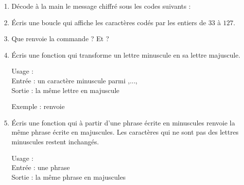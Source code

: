 \documentclass[11pt,class=report,crop=false]{standalone}
\begin{document}

\begin{activite}



\begin{enumerate}
  \item Décode à la main le message chiffré sous les codes suivants : 
   
    
  \item  Écris une boucle qui affiche les caractères codés par les entiers de $33$ à $127$.
  
  \item Que renvoie la commande  ? Et  ?
  
  \item Écris une fonction  qui transforme un lettre minuscule en sa lettre majuscule.
  
  \begin{fonction}
  
   Usage : \\
   Entrée : un caractère minuscule parmi ,...,\\
   Sortie : la même lettre en majuscule
  
  \medskip
     
   Exemple :  renvoie 
  \end{fonction} 
  
    \item Écris une fonction  qui à partir d'une phrase écrite en minuscules renvoie la même phrase écrite en majuscules. Les caractères qui ne sont pas des lettres minuscules restent inchangés.
  
  \begin{fonction}[\ci{majuscules()}]
   Usage : \\
   Entrée : une phrase\\
   Sortie : la même phrase en majuscules
  

\end{fonction}
\end{enumerate}
\end{activite}
\end{document}
